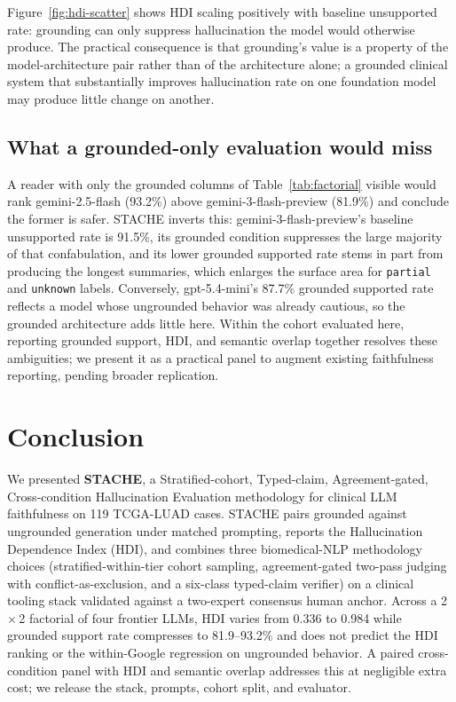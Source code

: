 \documentclass[11pt]{article}
\begin{document}
Figure~\ref{fig:hdi-scatter} shows HDI scaling positively with baseline unsupported rate: grounding can only suppress hallucination the model would otherwise produce. The practical consequence is that grounding's value is a property of the model-architecture pair rather than of the architecture alone; a grounded clinical system that substantially improves hallucination rate on one foundation model may produce little change on another.

\subsection{What a grounded-only evaluation would miss}

A reader with only the grounded columns of Table~\ref{tab:factorial} visible would rank gemini-2.5-flash (93.2\%) above gemini-3-flash-preview (81.9\%) and conclude the former is safer. STACHE inverts this: gemini-3-flash-preview's baseline unsupported rate is 91.5\%, its grounded condition suppresses the large majority of that confabulation, and its lower grounded supported rate stems in part from producing the longest summaries, which enlarges the surface area for \texttt{partial} and \texttt{unknown} labels. Conversely, gpt-5.4-mini's 87.7\% grounded supported rate reflects a model whose ungrounded behavior was already cautious, so the grounded architecture adds little here. Within the cohort evaluated here, reporting grounded support, HDI, and semantic overlap together resolves these ambiguities; we present it as a practical panel to augment existing faithfulness reporting, pending broader replication.

\section{Conclusion}
\label{sec:conclusion}

We presented \textbf{STACHE}, a Stratified-cohort, Typed-claim, Agreement-gated, Cross-condition Hallucination Evaluation methodology for clinical LLM faithfulness on 119 TCGA-LUAD cases. STACHE pairs grounded against ungrounded generation under matched prompting, reports the Hallucination Dependence Index (HDI), and combines three biomedical-NLP methodology choices (stratified-within-tier cohort sampling, agreement-gated two-pass judging with conflict-as-exclusion, and a six-class typed-claim verifier) on a clinical tooling stack validated against a two-expert consensus human anchor. Across a 2\,$\times$\,2 factorial of four frontier LLMs, HDI varies from 0.336 to 0.984 while grounded support rate compresses to 81.9--93.2\% and does not predict the HDI ranking or the within-Google regression on ungrounded behavior. A paired cross-condition panel with HDI and semantic overlap addresses this at negligible extra cost; we release the stack, prompts, cohort split, and evaluator.
\end{document}
